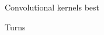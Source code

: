 \documentclass[a4paper,12pt,sort&compress]{article}
\begin{document}
\begin{figure}
    \centering
    \caption{Convolutional kernels best}
    \label{fig:conv_kernels_best}
\end{figure}

\begin{figure}
    \centering
    \caption{Turns}
    \label{fig:turns}
\end{figure}
\end{document}
